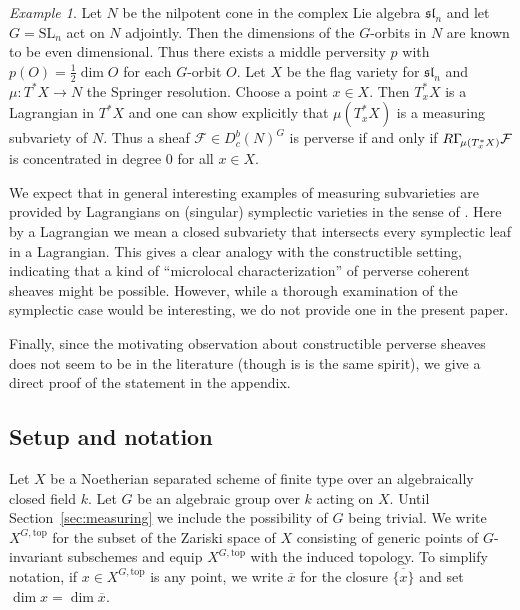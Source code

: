 \documentclass{compositio}
\theoremstyle{plain}
\theoremstyle{definition}
\theoremstyle{remark}
\newtheorem{Ex}[Thm]{Example}
\newcommand\sheaf{\mathcal}
\newcommand\liesl[1]{\mathfrak{sl}_#1}
\newcommand\SL[1]{\mathrm{SL}_#1}
\newcommand\lc[1]{\Gamma_{\mkern-3mu#1}}
\newcommand\Xtop[1][X]{#1^{G,\mathrm{top}}}
\begin{document}
\begin{Ex}
    Let $N$ be the nilpotent cone in the complex Lie algebra $\liesl n$ and let $G = \SL n$ act on $N$ adjointly.
    Then the dimensions of the $G$-orbits in $N$ are known to be even dimensional.
    Thus there exists a middle perversity $p$ with $p(O) = \frac12 \dim O$ for each $G$-orbit $O$.
    Let $X$ be the flag variety for $\liesl n$ and $\mu \colon T^*X \to  N$ the Springer resolution.
    Choose a point $x \in  X$.
    Then $T_x^*X$ is a Lagrangian in $T^*X$ and one can show explicitly that $\mu (T_x^*X)$ is a measuring subvariety of $N$.
    Thus a sheaf $\sheaf F \in  D_c^b(N)^G$ is perverse if and only if $R\lc{\mu (T_x^*X)}\sheaf F$ is concentrated in degree $0$ for all $x \in  X$.
\end{Ex}

We expect that in general interesting examples of measuring subvarieties are provided by Lagrangians on (singular) symplectic varieties in the sense of \cite{Beauville:2000:SymplecticSingularities}.
Here by a Lagrangian we mean a closed subvariety that intersects every symplectic leaf in a Lagrangian.
This gives a clear analogy with the constructible setting, indicating that a kind of \enquote{microlocal characterization} of perverse coherent sheaves might be possible.
However, while a thorough examination of the symplectic case would be interesting, we do not provide one in the present paper.

Finally, since the motivating observation about constructible perverse sheaves does not seem to be in the literature (though \cite[Theorem~3.5]{MirkovicVilonen:2007:GLdualityRepresentations} is is the same spirit), we give a direct proof of the statement in the appendix.

\subsection{Setup and notation}

Let $X$ be a Noetherian separated scheme of finite type over an algebraically closed field $k$.
Let $G$ be an algebraic group over $k$ acting on $X$.
Until Section~\ref{sec:measuring} we include the possibility of $G$ being trivial.
We write $\Xtop$ for the subset of the Zariski space of $X$ consisting of generic points of $G$-invariant subschemes and equip $\Xtop$ with the induced topology.
To simplify notation, if $x \in  \Xtop$ is any point, we write $\overline x$ for the closure $\overline{\{x\}}$ and set $\dim x = \dim \overline x$.
\end{document}
